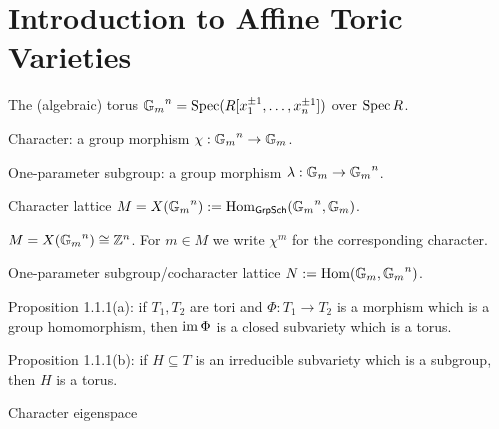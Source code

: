 \section{Introduction to Affine Toric Varieties}

\begin{definition}
  \label{torusOver}
  \leanok
  The (algebraic) torus ${\mathbb G_m}^n = \operatorname{Spec}(R[x_1^{\pm 1}, \dotsc, x_n^{\pm 1}])$ over $\operatorname{Spec} R$.
\end{definition}

\begin{definition}
  \label{char}
  Character: a group morphism $\chi : {\mathbb G_m}^n \to {\mathbb G_m}$.
\end{definition}

\begin{definition}
  \label{one_ps}
  One-parameter subgroup: a group morphism $\lambda : {\mathbb G_m} \to {\mathbb G_m}^n$.
\end{definition}

\begin{definition}
  \label{char_lattice}
  Character lattice $M = X({\mathbb G_m}^n) := \operatorname{Hom}_{\mathsf{GrpSch}}({\mathbb G_m}^n, {\mathbb G_m})$.
\end{definition}

\begin{proposition}
  \label{charTor}
  $M = X({\mathbb G_m}^n) \cong {\mathbb Z}^n$. For $m \in M$ we write $\chi^m$ for the corresponding character.
\end{proposition}

\begin{definition}
  \label{ops_lattice}
  One-parameter subgroup/cocharacter lattice $N := \operatorname{Hom}({\mathbb G_m}, {\mathbb G_m}^n)$.
\end{definition}

\begin{proposition}
  \label{prop:1.1.1.a}
  Proposition 1.1.1(a): if $T_1, T_2$ are tori and $\Phi : T_1 \to T_2$ is a morphism which is a group homomorphism, then $\operatorname{im} \Phi$ is a closed subvariety which is a torus.
\end{proposition}

\begin{proposition}
  \label{prop:1.1.1.b}
  Proposition 1.1.1(b): if $H \subseteq T$ is an irreducible subvariety which is a subgroup, then $H$ is a torus.
\end{proposition}

\begin{definition}
  \label{char_eigenspace}
  Character eigenspace
\end{definition}

